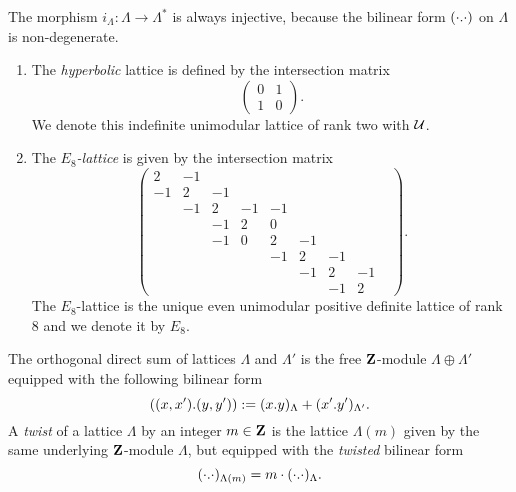 \begin{remark}
    The morphism $i_\Lambda \colon \Lambda \to \Lambda^*$ is always injective, because the bilinear form $(\cdot.\cdot)$ on $\Lambda$ is non-degenerate.
\end{remark}

\begin{example}
    \begin{enumerate}[label = (\roman*)]
        \item{The \emph{hyperbolic} lattice is defined by the intersection matrix
        \[
            \begin{pmatrix}
                0 & 1\\
                1 & 0
            \end{pmatrix}.
        \]
        We denote this indefinite unimodular lattice of rank two with $\mathcal U$.}
        \item{The \emph{$E_8$-lattice} is given by the intersection matrix
        \[
            \begin{pmatrix}
                2 & -1 & & & & & & \\
                -1 & 2 & -1 & & & & & \\
                & -1 & 2 & -1 & -1 & & & \\
                & & -1 & 2 & 0 & & & \\
                & & -1 & 0 & 2 & -1 & & \\
                & & & &  -1 & 2 & -1 & \\
                & & & & &  -1 & 2 & -1 & \\
                & & & & & & -1 & 2
            \end{pmatrix}.
        \]
        The $E_8$-lattice is the unique even unimodular positive definite lattice of rank $8$ and we denote it by $E_8$.}
    \end{enumerate}
\end{example}

\begin{definition}
    The orthogonal direct sum of lattices $\Lambda$ and $\Lambda'$ is the free $\mathbf Z$-module $\Lambda \oplus \Lambda'$ equipped with the following bilinear form
    \[
        ((x,x').(y,y')) := (x.y)_{\Lambda} + (x'.y')_{\Lambda'}.
    \]
    A \emph{twist} of a lattice $\Lambda$ by an integer $m \in \mathbf Z$ is the lattice $\Lambda(m)$ given by the same underlying $\mathbf Z$-module $\Lambda$, but equipped with the \emph{twisted} bilinear form
    \[
        (\cdot.\cdot)_{\Lambda(m)} = m \cdot (\cdot.\cdot)_{\Lambda}.
    \]
\end{definition}

